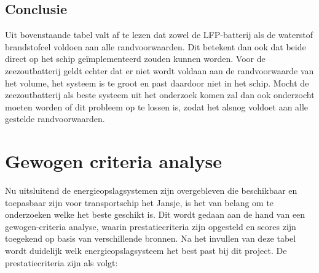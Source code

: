 \begin{table}[h]
\centering
\caption{Tabel van energieopslagmethoden specifiek voor Jansje}
\label{tab:prestatievergelijking_uitgebreid}
\end{table}

\subsection*{Conclusie}
\noindent Uit bovenstaande tabel valt af te lezen dat zowel de LFP-batterij als de waterstof brandstofcel voldoen aan alle randvoorwaarden. Dit betekent dan ook dat beide direct op het schip geïmplementeerd zouden kunnen worden. Voor de zeezoutbatterij geldt echter dat er niet wordt voldaan aan de randvoorwaarde van het volume, het systeem is te groot en past daardoor niet in het schip. Mocht de zeezoutbatterij als beste systeem uit het onderzoek komen zal dan ook onderzocht moeten worden of dit probleem op te lossen is, zodat het alsnog voldoet aan alle gestelde randvoorwaarden.

\section{Gewogen criteria analyse}


\noindent Nu uitsluitend de energieopslagsystemen zijn overgebleven die beschikbaar en toepasbaar zijn voor transportschip het Jansje, is het van belang om te onderzoeken welke het beste geschikt is. Dit wordt gedaan aan de hand van een gewogen-criteria analyse, waarin prestatiecriteria zijn opgesteld en scores zijn toegekend op basis van verschillende bronnen. Na het invullen van deze tabel wordt duidelijk welk energieopslagsysteem het best past bij dit project. De prestatiecriteria zijn als volgt:

